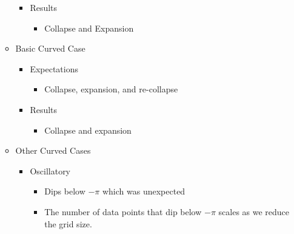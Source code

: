 \documentclass[12pt]{article}
\begin{document}
\begin{itemize}
\begin{itemize}
\begin{itemize}
                    \item Results

                        \begin{itemize}

                            \item Collapse and Expansion

                        \end{itemize}

                \end{itemize}

            \item Basic Curved Case

                \begin{itemize}

                    \item Expectations

                        \begin{itemize}

                            \item Collapse, expansion, and re-collapse

                        \end{itemize}

                    \item Results

                        \begin{itemize}

                            \item Collapse and expansion

                        \end{itemize}

                \end{itemize}

            \item Other Curved Cases

                \begin{itemize}

                    \item Oscillatory

                        \begin{itemize}

                            \item Dips below $-\pi$ which was unexpected

                            \item The number of data points that dip below $-\pi$ scales
                                as we reduce the grid size.


\end{itemize}
\end{itemize}
\end{itemize}
\end{itemize}
\end{document}
